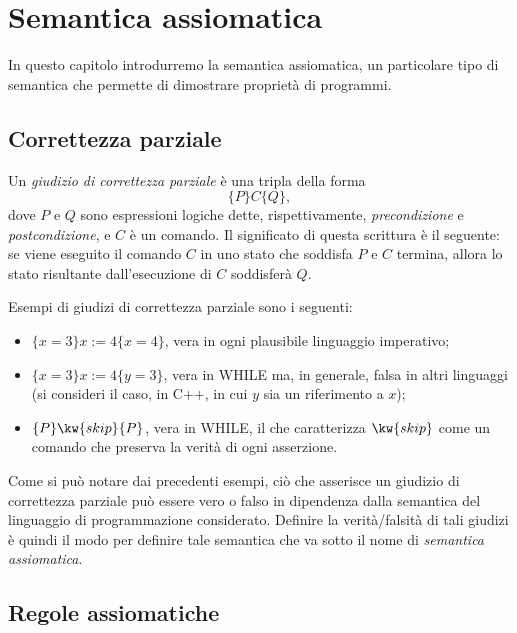 \chapter{Semantica assiomatica}

In questo capitolo introdurremo la semantica assiomatica, un particolare
tipo di semantica che permette di dimostrare proprietà di programmi.

\section{Correttezza parziale}
\begin{definizione}
Un \emph{giudizio di correttezza parziale} è una tripla
della forma
\[
  \{P\} C \{Q\},
\]
dove $P$ e $Q$ sono espressioni logiche dette,
rispettivamente, \emph{precondizione} e \emph{postcondizione},
e $C$ è un comando. Il significato di questa scrittura è
il seguente: se viene eseguito il comando $C$ in uno stato che
soddisfa $P$ e $C$ termina, allora lo stato risultante dall'esecuzione di $C$
soddisferà $Q$.
\end{definizione}

Esempi di giudizi di correttezza parziale sono i seguenti:
\begin{itemize}
\item
$\{ x = 3 \} x := 4 \{ x = 4 \}$, vera in ogni plausibile linguaggio imperativo;
\item
$\{ x = 3 \} x := 4 \{ y = 3 \}$, vera in WHILE ma, in generale,
falsa in altri linguaggi (si consideri il caso, in C++, in cui $y$ sia
un riferimento a $x$);
\item
$\{ P \} \kw{skip} \{ P \}$, vera in WHILE, il che caratterizza
$\kw{skip}$ come un comando che preserva la verità di ogni asserzione.
\end{itemize}

Come si può notare dai precedenti esempi, ciò che asserisce un
giudizio di correttezza parziale può essere vero o falso
in dipendenza dalla semantica del linguaggio di programmazione
considerato.
Definire la verità/falsità di tali giudizi è quindi il modo
per definire tale semantica che va sotto il nome di
\emph{semantica assiomatica}.

\section{Regole assiomatiche}

